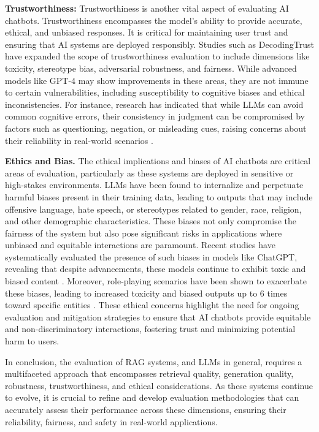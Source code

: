 \textbf{Trustworthiness:} Trustworthiness is another vital aspect of evaluating AI chatbots. Trustworthiness encompasses the model's ability to provide accurate, ethical, and unbiased responses. It is critical for maintaining user trust and ensuring that AI systems are deployed responsibly. Studies such as DecodingTrust have expanded the scope of trustworthiness evaluation to include dimensions like toxicity, stereotype bias, adversarial robustness, and fairness. While advanced models like GPT-4 may show improvements in these areas, they are not immune to certain vulnerabilities, including susceptibility to cognitive biases and ethical inconsistencies. For instance, research has indicated that while LLMs can avoid common cognitive errors, their consistency in judgment can be compromised by factors such as questioning, negation, or misleading cues, raising concerns about their reliability in real-world scenarios \cite{wang2023decodingtrust}.

\textbf{Ethics and Bias.} The ethical implications and biases of AI chatbots are critical areas of evaluation, particularly as these systems are deployed in sensitive or high-stakes environments. LLMs have been found to internalize and perpetuate harmful biases present in their training data, leading to outputs that may include offensive language, hate speech, or stereotypes related to gender, race, religion, and other demographic characteristics. These biases not only compromise the fairness of the system but also pose significant risks in applications where unbiased and equitable interactions are paramount. Recent studies have systematically evaluated the presence of such biases in models like ChatGPT, revealing that despite advancements, these models continue to exhibit toxic and biased content \cite{zhuo2023red}. Moreover, role-playing scenarios have been shown to exacerbate these biases, leading to increased toxicity and biased outputs up to 6 times toward specific entities \cite{deshpande2023toxicity}. These ethical concerns highlight the need for ongoing evaluation and mitigation strategies to ensure that AI chatbots provide equitable and non-discriminatory interactions, fostering trust and minimizing potential harm to users.

In conclusion, the evaluation of RAG systems, and LLMs in general, requires a multifaceted approach that encompasses retrieval quality, generation quality, robustness, trustworthiness, and ethical considerations. As these systems continue to evolve, it is crucial to refine and develop evaluation methodologies that can accurately assess their performance across these dimensions, ensuring their reliability, fairness, and safety in real-world applications.

